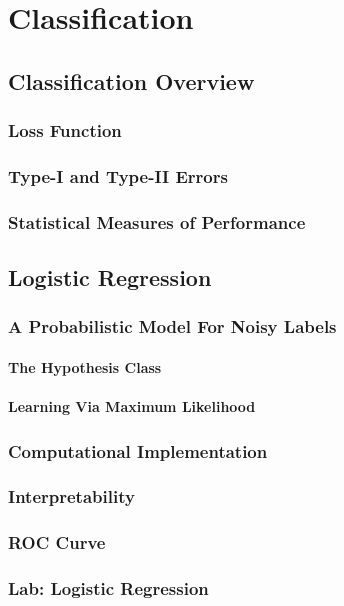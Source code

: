 \chapter{Classification}
    \section{Classification Overview}
        \subsection{Loss Function}
        \subsection{Type-I and Type-II Errors}
        \subsection{Statistical Measures of Performance}
        
    \section{Logistic Regression}
        \subsection{A Probabilistic Model For Noisy Labels}
            \subsubsection{The Hypothesis Class}
            \subsubsection{Learning Via Maximum Likelihood}
        \subsection{Computational Implementation}
        \subsection{Interpretability}
        \subsection{ROC Curve}
        \subsection{Lab: Logistic Regression}
    
